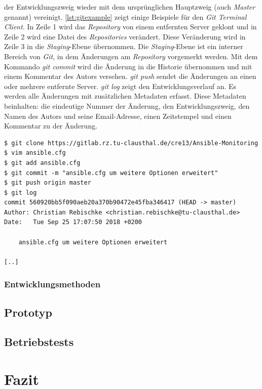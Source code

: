 \documentclass[titlepage]{report}
\begin{document}
der Entwicklungszweig wieder mit dem ursprünglichen Hauptzweig (auch
\emph{Master} genannt) vereinigt. \autoref{lst:gitexample} zeigt einige
Beispiele für den \emph{Git Terminal Client}. In Zeile 1 wird das
\emph{Repository} von einem entfernten Server geklont und in Zeile 2
wird eine Datei des \emph{Repositories} verändert. Diese Veränderung
wird in Zeile 3 in die \emph{Staging}\hyp{}Ebene übernommen. Die
\emph{Staging}\hyp{}Ebene ist ein interner Bereich von \emph{Git}, in dem
Änderungen am \emph{Repository} vorgemerkt werden\cite{PROGIT}. Mit dem
Kommando \emph{git commit} wird die Änderung in die Historie übernommen
und mit einem Kommentar des Autors versehen. \emph{git push} sendet die
Änderungen an einen oder mehrere entfernte Server. \emph{git log} zeigt
den Entwicklungsverlauf an. Es werden alle Änderungen mit
zusätzlichen Metadaten erfasst. Diese Metadaten beinhalten: die eindeutige
Nummer der Änderung, den Entwicklungszweig, den Namen des Autors und
seine Email\hyp{}Adresse, einen Zeitstempel und einen Kommentar zu der
Änderung.
\begin{minipage}{\linewidth}
\begin{lstlisting}[caption={Beispiele für die Verwendung des
Git-Clients},label={lst:gitexample}]
$ git clone https://gitlab.rz.tu-clausthal.de/cre13/Ansible-Monitoring
$ vim ansible.cfg
$ git add ansible.cfg
$ git commit -m "ansible.cfg um weitere Optionen erweitert"
$ git push origin master
$ git log
commit 560920bb5f090aeb20a370b90472e45fba346417 (HEAD -> master)
Author: Christian Rebischke <christian.rebischke@tu-clausthal.de>
Date:   Tue Sep 25 17:07:50 2018 +0200

    ansible.cfg um weitere Optionen erweitert

[..]
\end{lstlisting}
\end{minipage}
\subsection{Entwicklungsmethoden}
\section{Prototyp}
\section{Betriebstests}
\chapter{Fazit}
\nocite{*}
\printbibliography{}
\lstlistoflistings{}
\listoftables{}
\listoffigures
\printglossary{}
\end{document}
